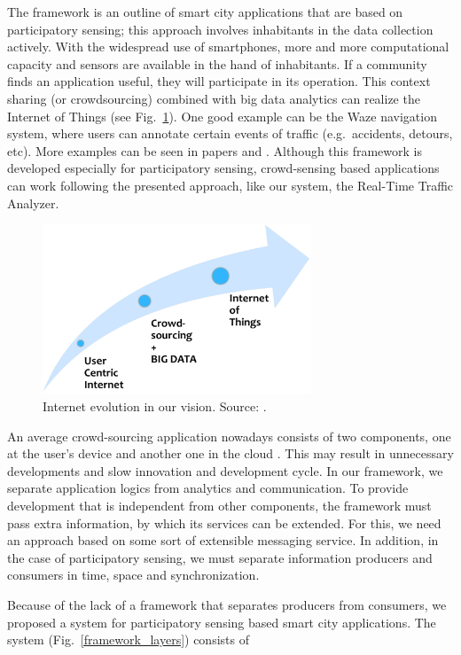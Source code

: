 \documentclass[b5paper,12pt]{report}
\theoremstyle{definition}
\begin{document}
The framework is an outline of smart city applications that are based on participatory sensing; this approach involves inhabitants in the data collection actively. With the widespread use of smartphones, more and more computational capacity and sensors are available in the hand of inhabitants. If a community finds an application useful, they will participate in its operation. This context sharing (or crowdsourcing) combined with big data analytics can realize the Internet of Things (see Fig.~\ref{framework_iot}). One good example can be the Waze navigation system, where users can annotate certain events of traffic (e.g.~accidents, detours, etc). More examples can be seen in papers \cite[chapter III]{szabo2013framework} and \cite{besenczi2013kozossegi}. Although this framework is developed especially for participatory sensing, crowd-sensing based applications can work following the presented approach, like our system, the Real-Time Traffic Analyzer.

\begin{figure}[ht!]
\centerline{
\includegraphics[width=8cm]{img/framework_iot.png}}
\caption{Internet evolution in our vision. Source: \cite{szabo2013framework}.}
\label{framework_iot}
\end{figure}

An average crowd-sourcing application nowadays consists of two components, one at the user's device and another one in the cloud \cite{ganti2011mobile}. This may result in unnecessary developments and slow innovation and development cycle. In our framework, we separate application logics from analytics and communication. To provide development that is independent from other components, the framework must pass extra information, by which its services can be extended. For this, we need an approach based on some sort of extensible messaging service. In addition, in the case of participatory sensing, we must separate information producers and consumers in time, space and synchronization.

Because of the lack of a framework that separates producers from consumers, we proposed a system for participatory sensing based smart city applications. The system (Fig.~\ref{framework_layers}) consists of
\end{document}
